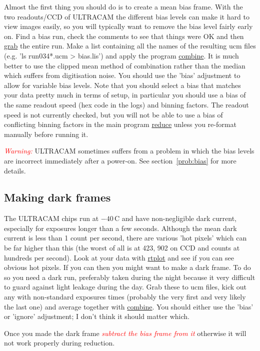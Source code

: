 \documentclass[10pt,a4paper,twocolumn]{article}
\newcommand{\main}{http://quetzel.csc.warwick.ac.uk/phsaap/software}
\newcommand{\ultracam}{\main/ultracam/html}
\newcommand{\warn}[1]{\textcolor{red}{\emph{#1}}}
\begin{document}
Almost the first thing you should do is to create a mean bias
frame. With the two readouts/CCD of ULTRACAM the different bias levels
can make it hard to view images easily, so you will typically want to
remove the bias level fairly early on. Find a bias run, check the
comments to see that things were OK and then
\href{\ultracam/grab.html}{grab} the entire run. Make a list
containing all the names of the resulting ucm files (e.g. 'ls
run034*.ucm > bias.lis') and apply the program
\href{\ultracam/combine.html}{combine}. It is much better to use the
clipped mean method of combination rather than the median which
suffers from digitisation noise. You should use the 'bias' adjustment
to allow for variable bias levels. Note that you should select a bias
that matches your data pretty much in terms of setup, in particular
you should use a bias of the same readout speed (hex code in the logs)
and binning factors. The readout speed is not currently checked, but
you will not be able to use a bias of conflicting binning factors in
the main program \href{\ultracam/reduce.html}{reduce} unless you
re-format manually before running it.

\warn{Warning:} ULTRACAM sometimes suffers from a problem in which the bias levels
are incorrect immediately after a power-on. See
section~\ref{prob:bias} for more details.

\subsection{Making dark frames}

The ULTRACAM chips run at $-40\,$C and have non-negligible dark
current, especially for exposures longer than a few seconds. Although
the mean dark current is less than 1 count per second, there are
various 'hot pixels' which can be far higher than this (the worst of
all is at 423, 902 on CCD and counts at hundreds per second). Look at
your data with \href{\ultracam/rtplot.html}{rtplot} and see if you can
see obvious hot pixels. If you can then you might want to make a dark
frame. To do so you need a dark run, preferably taken during the night
because it very difficult to guard against light leakage during the
day. Grab these to ucm files, kick out any with non-standard exposures
times (probably the very first and very likely the last one) and
average together with \href{\ultracam/combine.html}{combine}. You
should either use the 'bias' or 'ignore' adjustment; I don't think it
should matter which.

Once you made the dark frame \warn{subtract the bias frame from it} otherwise
it will not work properly during reduction.
\end{document}
